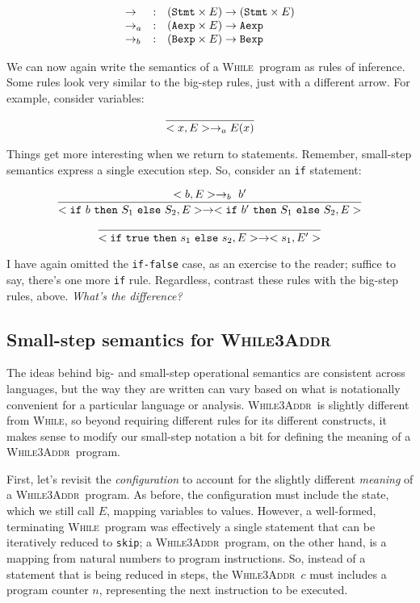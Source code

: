 \documentclass[11pt]{article}
\def\While{\textsc{While}}
\def\WhileThAddr{\textsc{While3Addr}}
\begin{document}
\[
\begin{array}{lll}
\rightarrow & : & (\mathtt{Stmt} \times E) \rightarrow (\mathtt{Stmt} \times E) \\
\rightarrow_a & : & (\mathtt{Aexp} \times E) \rightarrow \mathtt{Aexp} \\
\rightarrow_b & : & (\mathtt{Bexp} \times E) \rightarrow \mathtt{Bexp} \\
\end{array}
\]

\noindent We can now again write the semantics of a \While~program as rules of
inference.  Some rules look very similar to the big-step rules, just with a
different arrow.  For example, consider variables:

\[
\infer{<x, E> \rightarrow_a E(x)}{}
\]

\noindent Things get more interesting when we return to statements.  Remember,
small-step semantics express a single execution step.  So, consider an
\texttt{if} statement:

\[
\infer{<\mathtt{if}~b~\mathtt{then}~S_1~\mathtt{else}~S_2, E> \rightarrow <\mathtt{if}~b'~\mathtt{then}~S_1~\mathtt{else}~S_2, E>}
{ <b, E> \rightarrow_b~b'}
\]


\[
\infer{<\mathtt{if}~\mathtt{true}~\mathtt{then}~s_1~\mathtt{else}~s_2, E> \rightarrow
  <s_1,E'>}{}
\]

I have again omitted the \texttt{if-false} case, as an exercise to the reader; suffice
to say, there's one more \texttt{if} rule.  Regardless, contrast these rules with the
big-step rules, above.  \emph{What's the difference?}

\subsection{Small-step semantics for \WhileThAddr}

The ideas behind big- and small-step operational semantics are consistent
across languages, but the way they are written can vary based on what is
notationally convenient for a particular language or analysis.  
\WhileThAddr~is slightly different from \While, so beyond requiring different rules for its 
different constructs, it makes sense to modify our small-step notation a bit for defining the 
meaning of a \WhileThAddr~program.

First, let's revisit the \emph{configuration} to account for the slightly different \emph{meaning} of a
\WhileThAddr\ program.  As before, the configuration must include the state, which we still call $E$, mapping 
variables to values. However, a well-formed, terminating \While~program
was effectively a single statement that can be iteratively reduced to
\texttt{skip}; a \WhileThAddr~program, on the other hand, is a mapping from
natural numbers to program instructions. 
So, instead of a statement that is being reduced in steps, the \WhileThAddr~$c$ must
includes a program counter $n$, representing the next instruction to be
executed.  
\end{document}
